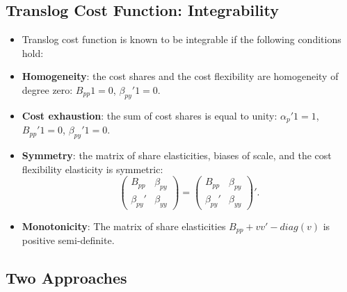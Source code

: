\documentclass[
]{book}
\providecommand{\tightlist}{%
  \setlength{\itemsep}{0pt}\setlength{\parskip}{0pt}}
\begin{document}
\hypertarget{translog-cost-function-integrability}{%
\subsection{Translog Cost Function: Integrability}\label{translog-cost-function-integrability}}

\begin{itemize}
\tightlist
\item
  Translog cost function is known to be integrable if the following conditions hold:
\item
  \textbf{Homogeneity}: the cost shares and the cost flexibility are homogeneity of degree zero: \(B_{pp}1 = 0\), \(\beta_{py}'1 = 0\).
\item
  \textbf{Cost exhaustion}: the sum of cost shares is equal to unity: \(\alpha_p'1 = 1\), \(B_{pp}'1 = 0\), \(\beta_{py}'1 = 0\).
\item
  \textbf{Symmetry}: the matrix of share elasticities, biases of scale, and the cost flexibility elasticity is symmetric:
  \begin{equation}
  \begin{pmatrix}
  B_{pp} & \beta_{py}\\
  \beta_{py}' & \beta_{yy}
  \end{pmatrix}
  =
  \begin{pmatrix}
  B_{pp} & \beta_{py}\\
  \beta_{py}' & \beta_{yy}
  \end{pmatrix}'.
  \end{equation}
\item
  \textbf{Monotonicity}: The matrix of share elasticities \(B_{pp} + vv' - diag(v)\) is positive semi-definite.
\end{itemize}

\hypertarget{two-approaches}{%
\subsection{Two Approaches}\label{two-approaches}}
\end{document}
